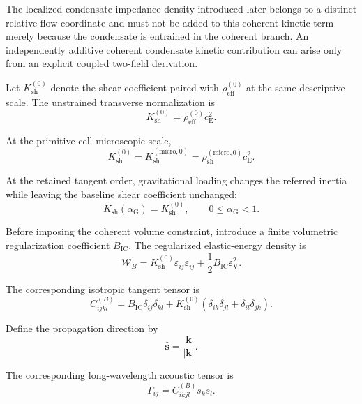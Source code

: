 The localized condensate impedance density introduced later belongs to a distinct relative-flow coordinate and must not be added to this coherent kinetic term merely because the condensate is entrained in the coherent branch. An independently additive coherent condensate kinetic contribution can arise only from an explicit coupled two-field derivation.

Let $K_{\mathrm{sh}}^{(0)}$ denote the shear coefficient paired with $\rho_{\mathrm{eff}}^{(0)}$ at the same descriptive scale. The unstrained transverse normalization is
\begin{equation}
    K_{\mathrm{sh}}^{(0)} = \rho_{\mathrm{eff}}^{(0)}c_{\mathrm{E}}^2.
\end{equation}

At the primitive-cell microscopic scale,
\begin{equation}
    K_{\mathrm{sh}}^{(0)} = K_{\mathrm{sh}}^{(\mathrm{micro},0)} = \rho_{\mathrm{sh}}^{(\mathrm{micro},0)}c_{\mathrm{E}}^2.
\end{equation}

At the retained tangent order, gravitational loading changes the referred inertia while leaving the baseline shear coefficient unchanged:
\begin{equation}
    K_{\mathrm{sh}}(\alpha_{\mathrm{G}}) = K_{\mathrm{sh}}^{(0)}, \qquad 0 \leq \alpha_{\mathrm{G}} < 1.
\end{equation}

Before imposing the coherent volume constraint, introduce a finite volumetric regularization coefficient $B_{\mathrm{IC}}$. The regularized elastic-energy density is
\begin{equation}
    \mathcal{W}_{B} = K_{\mathrm{sh}}^{(0)}\varepsilon_{ij}\varepsilon_{ij} + \frac{1}{2}B_{\mathrm{IC}}\varepsilon_{\mathrm{V}}^2.
\end{equation}

The corresponding isotropic tangent tensor is
\begin{equation}
    C_{ijkl}^{(B)} = B_{\mathrm{IC}}\delta_{ij}\delta_{kl} + K_{\mathrm{sh}}^{(0)}\left(\delta_{ik}\delta_{jl}+\delta_{il}\delta_{jk}\right).
\end{equation}

Define the propagation direction by
\begin{equation}
    \hat{\mathbf{s}} = \frac{\mathbf{k}}{|\mathbf{k}|}.
\end{equation}

The corresponding long-wavelength acoustic tensor is
\begin{equation}
    \Gamma_{ij} = C_{ikjl}^{(B)}s_{k}s_{l}.
\end{equation}

